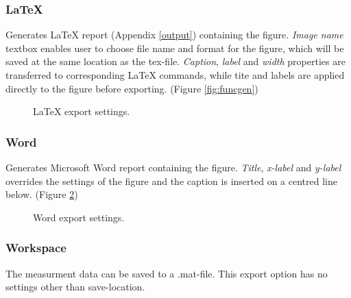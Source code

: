 \subsubsection*{LaTeX}
Generates LaTeX report (Appendix \ref{output}) containing the figure. \emph{Image name} textbox enables user to choose file name and format for the figure, which will be saved at the same location as the tex-file. \emph{Caption}, \emph{label} and \emph{width} properties are transferred to corresponding LaTeX commands, while tite and labels are applied directly to the figure before exporting. (Figure \ref{fig:funcgen})

\begin{figure}[H]
\centering
{}
\caption{LaTeX export settings.}
\label{fig:tex}
\end{figure}

\subsubsection*{Word}
Generates Microsoft Word report containing the figure. \emph{Title}, \emph{x-label} and \emph{y-label} overrides the settings of the figure and the caption is inserted on a centred line below. (Figure \ref{fig:word})

\begin{figure}[H]
\centering
{}
\caption{Word export settings.}
\label{fig:word}
\end{figure}

\subsubsection*{Workspace}
The measurment data can be saved to a .mat-file. This export option has no settings other than save-location.

\ifdefined\master
\else
	
\fi